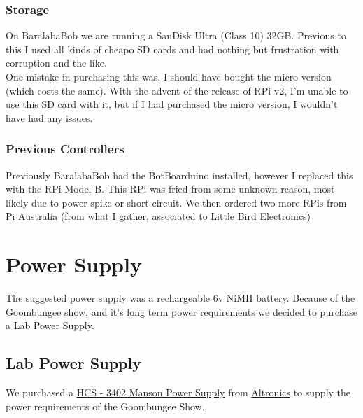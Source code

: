 				\subsubsection{Storage}
					On BaralabaBob we are running a SanDisk Ultra (Class 10) 32GB. Previous to this I used all kinds of cheapo SD cards and had nothing but frustration with corruption and the like.\\
					
					One mistake in purchasing this was, I should have bought the micro version (which costs the same). With the advent of the release of RPi v2, I’m unable to use this SD card with it, but if I had purchased the micro version, I wouldn’t have had any issues.\\
					
				\subsubsection{Previous Controllers}
        
                	\label{BotBoarduino}
					Previously BaralabaBob had the BotBoarduino installed, however I replaced this with the RPi Model B. This RPi was fried from some unknown reason, most likely due to power spike or short circuit. We then ordered two more RPis from Pi Australia (from what I gather, associated to Little Bird Electronics) 
					\pagebreak
	
	
		\section{Power Supply}
			The suggested power supply was a rechargeable 6v NiMH battery. Because of the Goombungee show, and it's long term power requirements we decided to purchase a Lab Power Supply.
			
			\subsection{Lab Power Supply}
				We purchased a \href{http://www.manson.com.hk/products/detail/159}{HCS - 3402 Manson Power Supply} from 
				\href{http://www.altronics.com.au/p/m8213-manson-1-30v-20a-regulated-lab-power-supply/}{Altronics} to supply the power requirements of the Goombungee Show.
				
